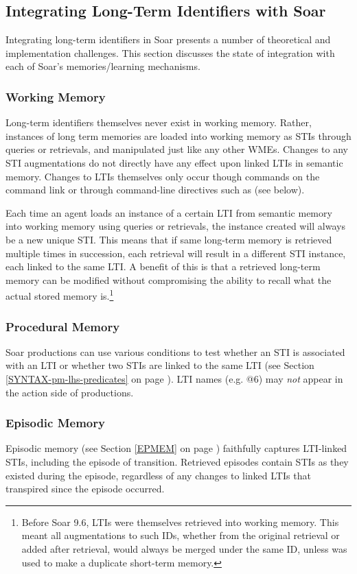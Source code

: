 \subsection{Integrating Long-Term Identifiers with Soar}
Integrating long-term identifiers in Soar presents a number of theoretical and implementation challenges.  
This section discusses the state of integration with each of Soar's memories/learning mechanisms.

\subsubsection{Working Memory}
Long-term identifiers themselves never exist in working memory. Rather, instances of long term memories are loaded into working memory as STIs through queries or retrievals, and manipulated just like any other WMEs. Changes to any STI augmentations do not directly have any effect upon linked LTIs in semantic memory. Changes to LTIs themselves only occur though  commands on the command link  or through command-line directives such as  (see below).

Each time an agent loads an instance of a certain LTI from semantic memory into working memory using queries or retrievals, the instance created will always be a new unique STI. This means that if same long-term memory is retrieved multiple times in succession, each retrieval will result in a different STI instance, each linked to the same LTI. A benefit of this is that a retrieved long-term memory can be modified without compromising the ability to recall what the actual stored memory is.\footnote{
	Before Soar 9.6, LTIs were themselves retrieved into working memory. This meant all augmentations to such IDs, whether from the original retrieval or added after retrieval, would always be merged under the same ID, unless  was used to make a duplicate short-term memory.}

\subsubsection{Procedural Memory}
Soar productions can use various conditions to test whether an STI is associated with an LTI or whether two STIs are linked to the same LTI (see Section \ref{SYNTAX-pm-lhs-predicates} on page \pageref{SYNTAX-pm-lhs-predicates}).
LTI names (e.g. {@}6) may \emph{not} appear in the action side of productions.

\subsubsection{Episodic Memory}
Episodic memory (see Section \ref{EPMEM} on page \pageref{EPMEM}) faithfully captures LTI-linked STIs, including the episode of transition. 
Retrieved episodes contain STIs as they existed during the episode, regardless of any changes to linked LTIs that transpired since the episode occurred.

